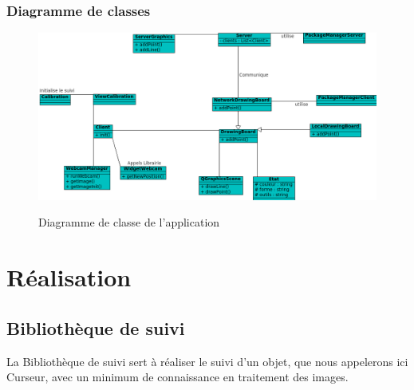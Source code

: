 \documentclass{report}
\begin{document}
			\newpage
			\subsection{Diagramme de classes}
				\begin{figure}[!h]
						\centering
						\includegraphics[scale=0.6]{../uml/classes.png}\\
						\caption{Diagramme de classe de l'application}
						\label{Diagramme de classe de l'application}
				\end{figure}
				
	
	\chapter{Réalisation}
		\section{Bibliothèque de suivi}
			La Bibliothèque de suivi sert à réaliser le suivi d'un objet, que nous appelerons ici Curseur, avec un minimum de connaissance en traitement des images.\\
\end{document}
